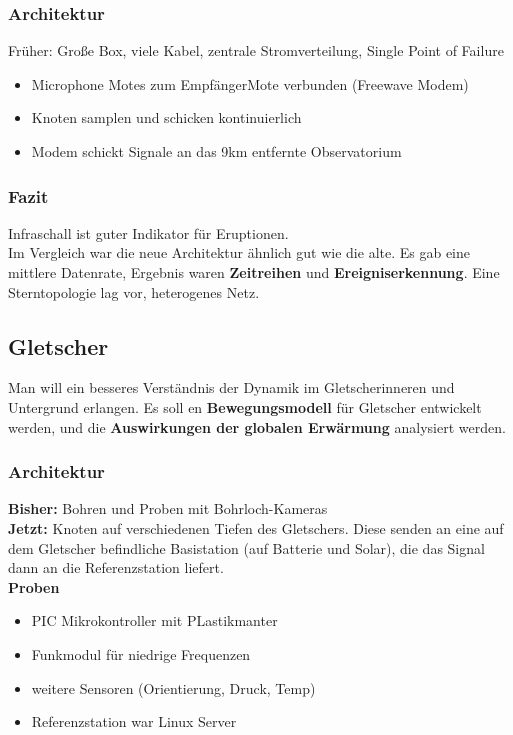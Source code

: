 \documentclass[a4paper]{article}
\begin{document}
\subsubsection{Architektur}
Früher: Große Box, viele Kabel, zentrale Stromverteilung, Single Point of Failure
	\begin{itemize}
		\item Microphone Motes zum EmpfängerMote verbunden (Freewave Modem)
		\item Knoten samplen und schicken kontinuierlich
		\item Modem schickt Signale an das 9km entfernte Observatorium
	\end{itemize}	

\subsubsection{Fazit}
	Infraschall ist guter Indikator für Eruptionen.\\
	Im Vergleich war die neue Architektur ähnlich gut wie die alte. Es gab eine mittlere Datenrate, Ergebnis waren \textbf{Zeitreihen} und \textbf{Ereigniserkennung}. Eine Sterntopologie lag vor, heterogenes Netz.
	
\subsection{Gletscher}
Man will ein besseres Verständnis der Dynamik im Gletscherinneren und Untergrund erlangen. Es soll en \textbf{Bewegungsmodell} für Gletscher entwickelt werden, und die \textbf{Auswirkungen der globalen Erwärmung} analysiert werden.
\subsubsection{Architektur}
\textbf{Bisher:} Bohren und Proben mit Bohrloch-Kameras\\
\textbf{Jetzt:} Knoten auf verschiedenen Tiefen des Gletschers. Diese senden an eine auf dem Gletscher befindliche Basistation (auf Batterie und Solar), die das Signal dann an die Referenzstation liefert.\\
\textbf{Proben}
\begin{itemize}
	\item PIC Mikrokontroller mit PLastikmanter
	\item Funkmodul für niedrige Frequenzen
	\item weitere Sensoren (Orientierung, Druck, Temp)
	\item Referenzstation war Linux Server
\end{itemize}
\end{document}

